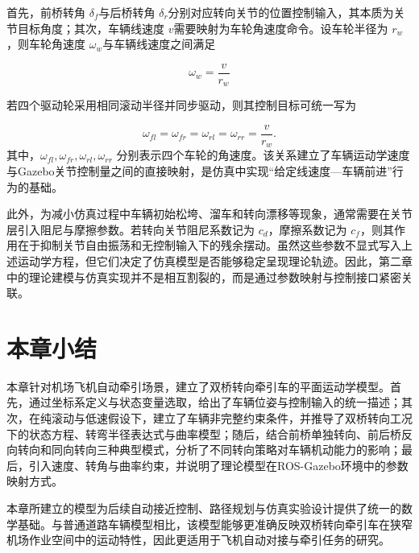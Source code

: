 首先，前桥转角 \(\delta_{f}\)与后桥转角
\(\delta_{r}\)分别对应转向关节的位置控制输入，其本质为关节目标角度；其次，车辆线速度
\(v\)需要映射为车轮角速度命令。设车轮半径为 \(r_{w}\)，则车轮角速度
\(\omega_{w}\)与车辆线速度之间满足

\begin{equation}
\omega_{w} = \frac{v}{r_{w}}
\label{eq:13}
\end{equation}

若四个驱动轮采用相同滚动半径并同步驱动，则其控制目标可统一写为

\begin{equation}
\omega_{fl}=\omega_{fr}=\omega_{rl}=\omega_{rr}=\frac{v}{r_w}.
\label{eq:wheel_speed_all}
\end{equation}
其中，\(\omega_{fl},\omega_{fr},\omega_{rl},\omega_{rr}\)
分别表示四个车轮的角速度。该关系建立了车辆运动学速度与Gazebo关节控制量之间的直接映射，是仿真中实现``给定线速度---车辆前进''行为的基础。

此外，为减小仿真过程中车辆初始松垮、溜车和转向漂移等现象，通常需要在关节层引入阻尼与摩擦参数\cite{ref13,ref14,ref16}。若转向关节阻尼系数记为
\(c_{d}\)，摩擦系数记为
\(c_{f}\)，则其作用在于抑制关节自由振荡和无控制输入下的残余摆动。虽然这些参数不显式写入上述运动学方程，但它们决定了仿真模型是否能够稳定呈现理论轨迹。因此，第二章中的理论建模与仿真实现并不是相互割裂的，而是通过参数映射与控制接口紧密关联。

\section{本章小结}

本章针对机场飞机自动牵引场景，建立了双桥转向牵引车的平面运动学模型。首先，通过坐标系定义与状态变量选取，给出了车辆位姿与控制输入的统一描述；其次，在纯滚动与低速假设下，建立了车辆非完整约束条件，并推导了双桥转向工况下的状态方程、转弯半径表达式与曲率模型；随后，结合前桥单独转向、前后桥反向转向和同向转向三种典型模式，分析了不同转向策略对车辆机动能力的影响；最后，引入速度、转角与曲率约束，并说明了理论模型在ROS-Gazebo环境中的参数映射方式。

本章所建立的模型为后续自动接近控制、路径规划与仿真实验设计提供了统一的数学基础。与普通道路车辆模型相比，该模型能够更准确反映双桥转向牵引车在狭窄机场作业空间中的运动特性，因此更适用于飞机自动对接与牵引任务的研究。
